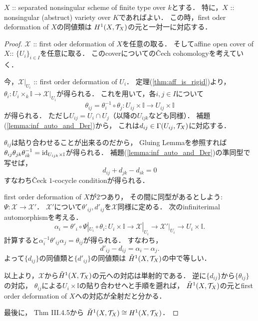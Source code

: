 \documentclass[a4paper]{jsarticle}
\newcommand{\dualnum}{\mathbb{I}}
\newcommand{\famX}{\mathcal{X}}
\begin{document}
    \begin{Thm}
        $X$ :: separated nonsingular scheme of finite type over $k$とする．
        特に，$X$ :: nonsingular (abstruct) variety over $K$であればよい．
        この時，first oder deformation of $X$の同値類は
        $H^1(X, \mathcal{T}_X)$の元と一対一に対応する．
    \end{Thm}
    \begin{proof}
        $\famX$ :: first oder deformation of $X$を任意の取る．
        そしてaffine open cover of $X$:: $\{U_i\}_{i \in I}$を任意に取る．
        このcoverについての\v{C}ech cohomologyを考えていく．

        今，$\famX|_{U_i}$ :: first order deformation of $U_i$．
        定理(\ref{thm:aff_is_rigid})より，
        $\theta_{i}: U_i \times_{k} \dualnum \to \famX|_{U_i}$が得られる．
        これを用いて，各$i,j \in I$について
        \[ \theta_{ij}=\theta_{i}^{-1} \circ \theta_{j}:U_{ij} \times \dualnum \to U_{ij} \times \dualnum \]
        が得られる．
        ただし$U_{ij}=U_i \cap U_j$（以降の$U_{ijk}$なども同様）．
        補題(\ref{lemma:inf_auto_and_Der})から，
        これは$d_{ij} \in \Gamma(U_{ij}, \mathcal{T}_{X})$に対応する．
        
        $\theta_{ij}$は貼り合わせることが出来るのだから，
        Gluing Lemmaを参照すれば
        $\theta_{ij} \theta_{jk} \theta_{ik}^{-1}=\id[U_{ijk} \times \dualnum]$が得られる．
        補題(\ref{lemma:inf_auto_and_Der})の準同型で写せば，
        \[ d_{ij}+d_{jk}-d_{ik}=0 \]
        すなわち\v{C}eck $1$-cocycle conditionが得られる．

        first order deformation of $X$が$2$つあり，
        その間に同型があるとしよう: $\Psi: \famX \to \famX'$．
        $\famX'$について$\theta'_{ij}, d'_{ij}$を$\famX$同様に定める．
        次のinfiniterimal automorphismを考える．
        \[
            \alpha_{i}=\theta'_{i} \circ \Psi|_{U_i} \circ \theta_{i}:
            U_i \times \dualnum \to \famX|_{U_i} \to \famX'|_{U_i} \to U_i \times \dualnum.
        \]
        計算すると$\alpha_{i}^{-1} \theta'_{ij} \alpha_{j}=\theta_{ij}$が得られる．
        すなわち，
        \[ d'_{ij}-d_{ij}=\alpha_{i}-\alpha_{j}. \]
        よって$\{d_{ij}\}$の同値類と$\{d'_{ij}\}$の同値類は
        $\check{H}^1(X, \mathcal{T}_X)$の中で等しい．

        以上より，$\famX$から$\check{H}^1(X, \mathcal{T}_X)$の元への対応は単射的である．
        逆に$\{d_{ij}\}$から$\{\theta_{ij}\}$の対応，
        $\theta_{ij}$による$U_{i} \times \dualnum$の貼り合わせへと手順を遡れば，
        $\check{H}^1(X, \mathcal{T}_X)$の元とfirst order deformation of $X$への対応が全射だと分かる．

        最後に，\cite{HarAG} Thm III.4.5から
        $\check{H}^1(X, \mathcal{T}_X) \cong H^1(X, \mathcal{T}_X)$．
    \end{proof}
\end{document}
